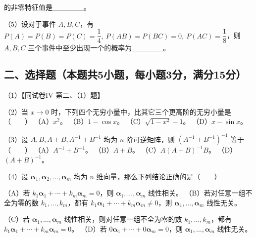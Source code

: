 \documentclass[UTF8,12pt]{ctexart}
\begin{document}
的非零特征值是\_\_\_\_\_\_。


（5）设对于事件 \(\displaystyle A,\allowbreak B,\allowbreak C\)，有 \(\displaystyle P(A)=P(B)=P(C)=\dfrac{\displaystyle 1}{\displaystyle 4},\allowbreak \ P(AB)=P(BC)=0,\allowbreak \ P(AC)=\dfrac{\displaystyle 1}{\displaystyle 8}\)，则 \(\displaystyle A,\allowbreak B,\allowbreak C\) 三个事件中至少出现一个的概率为\_\_\_\_\_\_。


\subsection*{二、选择题（本题共5小题，每小题3分，满分15分）}

（1）【同试卷IV 第二、（1）题】


（2）当 \(\displaystyle x\to0\) 时，下列四个无穷小量中，比其它三个更高阶的无穷小量是（　　） （A）\(\displaystyle x^2\)。 （B）\(\displaystyle 1-\cos x\)。 （C）\(\displaystyle \sqrt{1-x^2}-1\)。 （D）\(\displaystyle x-\sin x\)。


（3）设 \(\displaystyle A,\allowbreak B,\allowbreak A+B,\allowbreak A^{-1}+B^{-1}\) 均为 \(\displaystyle n\) 阶可逆矩阵，则 \(\displaystyle (A^{-1}+B^{-1})^{-1}\) 等于（　　） （A）\(\displaystyle A^{-1}+B^{-1}\)。 （B）\(\displaystyle A+B\)。 （C）\(\displaystyle A(A+B)^{-1}B\)。 （D）\(\displaystyle (A+B)^{-1}\)。


（4）设 \(\displaystyle \boldsymbol\alpha_1,\allowbreak \boldsymbol\alpha_2,\allowbreak \ldots,\allowbreak \boldsymbol\alpha_m\) 均为 \(\displaystyle n\) 维向量，那么下列结论正确的是（　　）


（A）若 \(\displaystyle k_1\boldsymbol\alpha_1+\cdots+k_m\boldsymbol\alpha_m=0\)，则 \(\displaystyle \boldsymbol\alpha_1,\allowbreak \ldots,\allowbreak \boldsymbol\alpha_m\) 线性相关。 （B）若对任意一组不全为零的数 \(\displaystyle k_1,\allowbreak \ldots,\allowbreak k_m\)，都有 \(\displaystyle k_1\boldsymbol\alpha_1+\cdots+k_m\boldsymbol\alpha_m\ne0\)，则 \(\displaystyle \boldsymbol\alpha_1,\allowbreak \ldots,\allowbreak \boldsymbol\alpha_m\) 线性无关。


（C）若 \(\displaystyle \boldsymbol\alpha_1,\allowbreak \ldots,\allowbreak \boldsymbol\alpha_m\) 线性相关，则对任意一组不全为零的数 \(\displaystyle k_1,\allowbreak \ldots,\allowbreak k_m\)，都有 \(\displaystyle k_1\boldsymbol\alpha_1+\cdots+k_m\boldsymbol\alpha_m=0\)。 （D）若 \(\displaystyle 0\boldsymbol\alpha_1+\cdots+0\boldsymbol\alpha_m=0\)，则 \(\displaystyle \boldsymbol\alpha_1,\allowbreak \ldots,\allowbreak \boldsymbol\alpha_m\) 线性无关。
\end{document}
